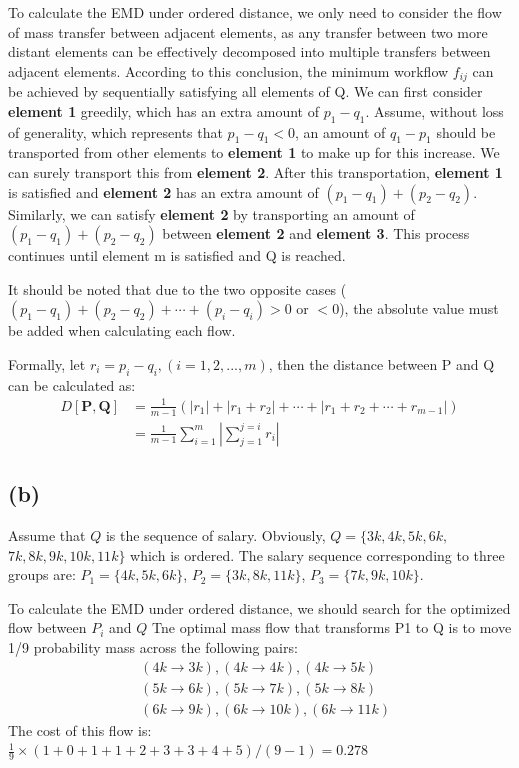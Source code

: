 \documentclass[a4paper,12pt]{article}
\begin{document}
To calculate the EMD under ordered distance,
we only need to consider the flow of mass transfer between adjacent elements,
as any transfer between two more distant elements can be effectively decomposed into multiple transfers between adjacent elements.
According to this conclusion, the minimum workflow $f_{ij}$ can be achieved by sequentially satisfying all elements of Q.
We can first consider \textbf{element 1} greedily, which has an extra amount of $p_1 - q_1$.
Assume, without loss of generality, which represents that $p_1 - q_1 < 0$,
an amount of $q_1 - p_1$ should be transported from other elements to \textbf{element 1} to make up for this increase.
We can surely transport this from \textbf{element 2}.
After this transportation, \textbf{element 1} is satisfied and \textbf{element 2} has an extra amount of
$(p_1 - q_1) + (p_2 - q_2)$.
Similarly, we can satisfy \textbf{element 2} by transporting an amount of $(p_1 - q_1) + (p_2 - q_2)$ between \textbf{element 2} and \textbf{element 3}.
This process continues until element m is satisfied and Q is reached.

It should be noted that due to the two opposite cases ($(p_1 - q_1) + (p_2 - q_2) + \cdots + (p_i - q_i) > 0$ or $ < 0$), the absolute value must be added when calculating each flow.

Formally, let $r_i = p_i - q_i ,(i=1,2,...,m)$, then the distance
between P and Q can be calculated as:
\begin{equation}
    \begin{aligned}
        D[\textbf{P}, \textbf{Q}] & = \frac{1}{m-1}(|r_1| + |r_1+ r_2| + \cdots + |r_1 + r_2 + \cdots + r_{m-1}|) \\
                                  & =\frac{1}{m-1}\sum\limits_{i = 1}^{m}|\sum\limits_{j = 1}^{j=i} r_i|
    \end{aligned}
\end{equation}

\subsection{(b)}
Assume that $Q$ is the sequence of salary.
Obviously, $Q = \{3k, 4k, 5k, 6k,$
\newline
$7k, 8k, 9k, 10k, 11k\}$ which is ordered.
The salary sequence corresponding to three groups are:
$P_1 = \{4k, 5k, 6k\}$, $P_2 = \{3k, 8k, 11k\}$,  $P_3 = \{7k, 9k, 10k\}$.

To calculate the EMD under ordered distance, we should search for the optimized flow between $P_i$ and $Q$
Tne optimal mass flow that transforms P1 to Q is to move 1/9 probability mass across the following pairs:
\begin{equation}
    \begin{aligned}
         & (4k \rightarrow 3k), (4k \rightarrow 4k), (4k \rightarrow 5k)   \\
         & (5k \rightarrow 6k), (5k \rightarrow 7k), (5k \rightarrow 8k)   \\
         & (6k \rightarrow 9k), (6k \rightarrow 10k), (6k \rightarrow 11k)
    \end{aligned}
\end{equation}
The cost of this flow is: $\frac{1}{9}\times(1+0+1+1+2+3+3+4+5)/(9-1) = 0.278$
\end{document}
